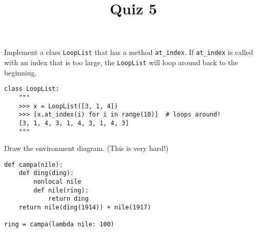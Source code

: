 \documentclass[twoside]{article}
\title{\sc Quiz 5}
\begin{document}
\maketitle

\begin{enumerate}

Implement a class \lstinline{LoopList} that has a method \lstinline{at_index}. If \lstinline{at_index} is called with an index that is too large, the \lstinline{LoopList} will loop around back to the beginning.
\vspace{0.1in}

\begin{lstlisting}
class LoopList:
    """
    >>> x = LoopList([3, 1, 4])
    >>> [x.at_index(i) for i in range(10)]  # loops around!
    [3, 1, 4, 3, 1, 4, 3, 1, 4, 3]
    """
\end{lstlisting}

\newpage


Draw the environment diagram. (This is very hard!)
\vspace{0.1in}

\begin{lstlisting}
def campa(nile):
    def ding(ding):
        nonlocal nile
        def nile(ring):
            return ding
    return nile(ding(1914)) + nile(1917)

ring = campa(lambda nile: 100)
\end{lstlisting}

\end{enumerate}
\end{document}

